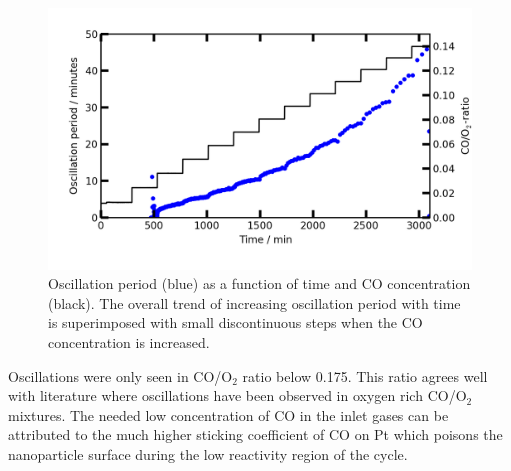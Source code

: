 \documentclass[journal=jacsat,manuscript=article]{achemso}
\begin{document}
\begin{figure}
  \includegraphics[width=12cm]{oscil_gas_dependence_summary.png}
  \caption{Oscillation period (blue) as a function of time and CO concentration (black). The
  overall trend of increasing oscillation period with time is superimposed with small
  discontinuous steps when the CO concentration is increased.} 
  \label{fgr:gas_dependence_summary}
\end{figure}

Oscillations were only seen in CO/O$_2$ ratio below 0.175. This ratio agrees
well with literature \cite{Singh2010,Hendriksen2005} where oscillations have
been observed in oxygen rich CO/O$_2$ mixtures. The needed low concentration of
CO in the inlet gases can be attributed to the much higher sticking coefficient
of CO on Pt which poisons the nanoparticle surface during the low reactivity
region of the cycle.
\end{document}
